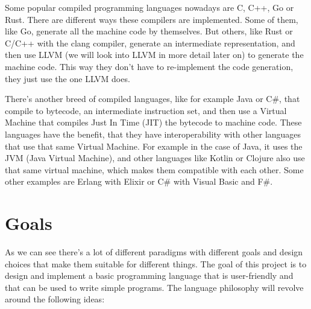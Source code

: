 ﻿\documentclass[10pt,a4paper,twocolumn,twoside]{article}
\begin{document}
Some popular compiled programming languages nowadays are C, C++, Go or Rust.
There are different ways these compilers are implemented. Some of them, like Go,
generate all the machine code by themselves. But others, like Rust or C/C++
with the clang compiler, generate an intermediate representation, and then use
LLVM (we will look into LLVM in more detail later on) to generate the machine
code. This way they don't have to re-implement the code generation, they just
use the one LLVM does.

There's another breed of compiled languages, like for example Java or C\#, that
compile to bytecode, an intermediate instruction set, and then use a Virtual 
Machine that compiles Just In Time (JIT) the bytecode to machine code. These 
languages have the benefit, that they have interoperability with other languages
that use that same Virtual Machine. For example in the case of Java, it uses the
JVM (Java Virtual Machine), and other languages like Kotlin or Clojure also use
that same virtual machine, which makes them compatible with each other. Some 
other examples are Erlang with Elixir or C\# with Visual Basic and F\#.



\section{Goals}

As we can see there's a lot of different paradigms with different goals and
design choices that make them suitable for different things. The goal of this
project is to design and implement a basic programming language that is
user-friendly and that can be used to write simple programs. The language
philosophy will revolve around the following ideas:
\end{document}
